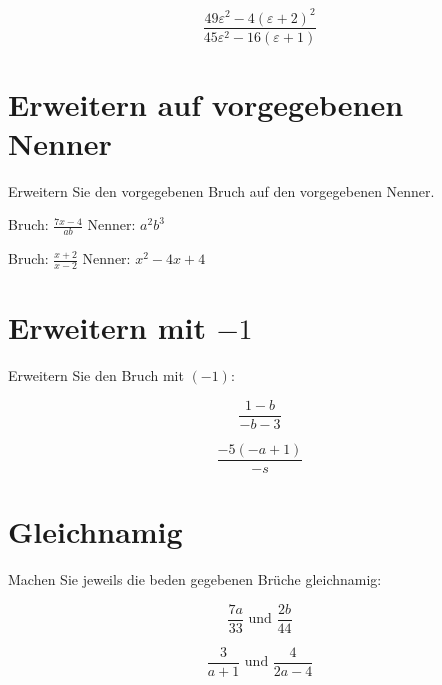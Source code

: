 {\begin{bbwAufgabenBlock}
\item $$\frac{49\varepsilon^2 - 4(\varepsilon+2)^2}{45\varepsilon^2 - 16(\varepsilon+1)}$$


\end{bbwAufgabenBlock}
\newpage
\section{Erweitern auf vorgegebenen Nenner}
Erweitern Sie den vorgegebenen Bruch auf den vorgegebenen Nenner.

\begin{bbwAufgabenBlock}
\item
Bruch: $\frac{7x-4}{ab}$  Nenner: $a^2b^3$


\item
Bruch: $\frac{x+2}{x-2}$  Nenner: $x^2-4x+4$

\end{bbwAufgabenBlock}
\section{Erweitern mit $-1$}
Erweitern Sie den Bruch mit $(-1)$:

\begin{bbwAufgabenBlock}
\item $$\frac{1-b}{-b-3}$$


\item $$\frac{-5(-a+1)}{-s}$$
\end{bbwAufgabenBlock}
\section{Gleichnamig}
Machen Sie jeweils die beden gegebenen Brüche gleichnamig:

\begin{bbwAufgabenBlock}
\item $$\frac{7a}{33} \text{ und } \frac{2b}{44}$$

\item $$\frac{3}{a+1} \text{ und } \frac{4}{2a-4}$$


\end{bbwAufgabenBlock}}
